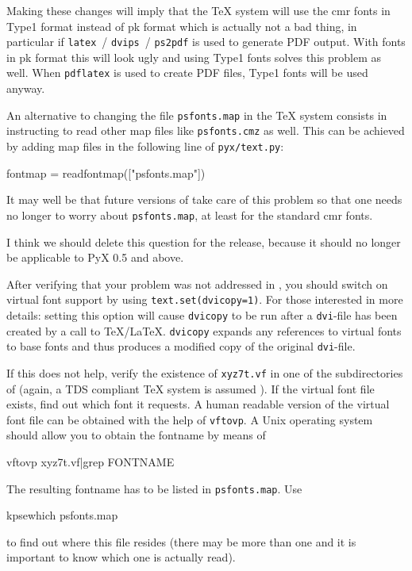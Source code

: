 \documentclass[11pt,DIV14]{scrartcl}
\begin{document}
{Making these changes will imply that the \TeX{} system will use the cmr fonts 
in Type1 format instead of pk format which is actually not a bad thing, in 
particular if \texttt{latex}~/ \texttt{dvips}~/ \texttt{ps2pdf} is used to 
generate PDF output. With fonts in pk format this will look ugly and using 
Type1 fonts solves this problem as well. When \texttt{pdflatex} is used to 
create PDF files, Type1 fonts will be used anyway.

An alternative to changing the file \texttt{psfonts.map} in the \TeX{} system 
consists in instructing \PyX{} to read other map files like 
\texttt{psfonts.cmz} as well. This can be achieved by adding map files in the 
following line of 
\texttt{pyx/text.py}:
\begin{progcode}
fontmap = readfontmap(["psfonts.map"])
\end{progcode}

It may well be that future versions of \PyX{} take care of this problem so that
one needs no longer to worry about \texttt{psfonts.map}, at least for the
standard cmr fonts.
}

{I think we should delete this question for the release, because it
  should no longer be applicable to PyX 0.5 and above.}
{After verifying that your problem was not addressed in , 
you should switch on virtual font support by using \texttt{text.set(dvicopy=1)}.
For those interested in more details: setting this option will cause
\texttt{dvicopy} to be run after a \texttt{dvi}-file has been created by a call 
to \TeX/\LaTeX. \texttt{dvicopy} expands any references to virtual fonts to
base fonts and thus produces a modified copy of the original \texttt{dvi}-file.

If this does not help, verify the existence of \texttt{xyz7t.vf} in one of the 
subdirectories of  (again, a TDS compliant \TeX{} 
system is assumed ). If the 
virtual font file exists, find out which font it requests. A human readable 
version of the virtual font file can be obtained with the help of 
\texttt{vftovp}. A Unix operating system should allow you to obtain the 
fontname by means of
\begin{progcode}
vftovp xyz7t.vf|grep FONTNAME
\end{progcode}
The resulting fontname has to be listed in \texttt{psfonts.map}. Use
\begin{progcode}
kpsewhich psfonts.map
\end{progcode}
to find out where this file resides (there may be more than one and it is
important to know which one is actually read).
}
\end{document}
